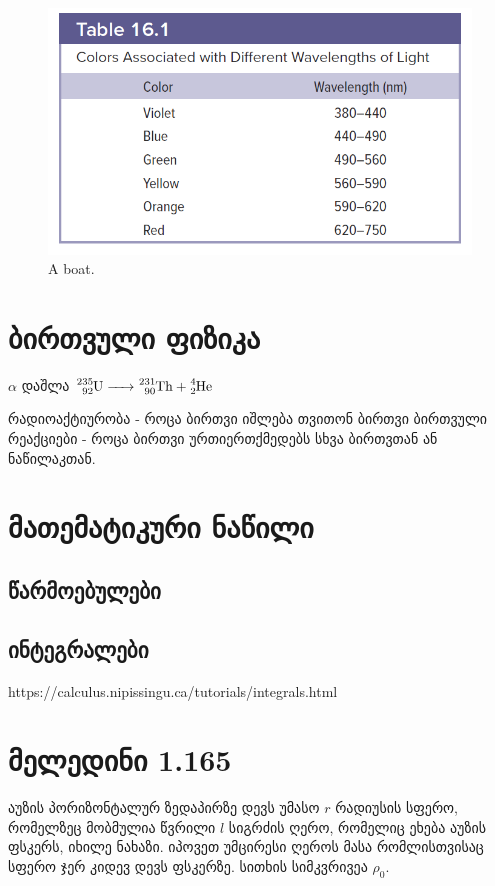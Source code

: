 \documentclass[a4paper]{book}
\begin{document}
	\begin{figure}[H]
    	\includegraphics[width=0.8\columnwidth]{figures/yyyu}
    \caption{A boat.}
    \label{fig:02}
    \end{figure}


\chapter{ბირთვული ფიზიკა}
$\alpha$ დაშლა $\ce{^235_92U -> ^231_90Th + ^4_2He}$

რადიოაქტიურობა - როცა ბირთვი იშლება თვითონ ბირთვი
ბირთვული რეაქციები - როცა ბირთვი ურთიერთქმედებს სხვა ბირთვთან ან ნაწილაკთან.

\chapter{მათემატიკური ნაწილი}
\section{წარმოებულები}
\section{ინტეგრალები}
https://calculus.nipissingu.ca/tutorials/integrals.html

\chapter{მელედინი 1.165} აუზის პორიზონტალურ ზედაპირზე დევს უმასო $r$ რადიუსის სფერო, რომელზეც მობმულია წვრილი $l$ სიგრძის ღერო, რომელიც ეხება აუზის ფსკერს, იხილე ნახაზი. იპოვეთ უმცირესი ღეროს მასა რომლისთვისაც სფერო ჯერ კიდევ დევს ფსკერზე. სითხის სიმკვრივეა $\rho_0$. 
\end{document}
